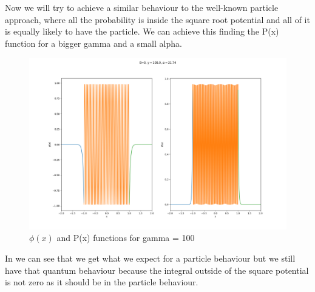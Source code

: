 Now we will try to achieve a similar behaviour to the well-known particle approach, where all the probability is inside the square root potential and all of it is equally likely to have the particle. We can achieve this finding the P(x) function for a bigger gamma and a small alpha.

\begin{figure}[H]
    \centering
    \includegraphics{images3/phi_gamma=100.0_alpha=21.74.png}
    \caption{$\phi(x)$ and P(x) functions for gamma = 100}
\end{figure}

In  we can see that we get what we expect for a particle behaviour but we still have that quantum behaviour because the integral outside of the square potential is not zero as it should be in the particle behaviour.





